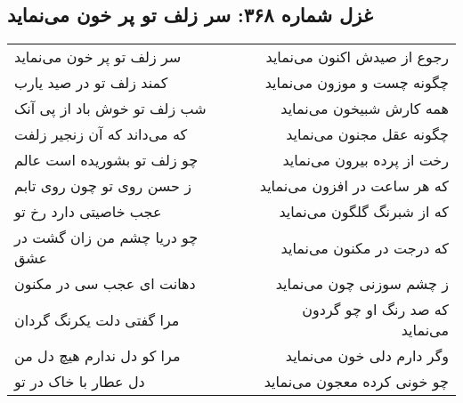 \begin{center}
\section*{غزل شماره ۳۶۸: سر زلف تو پر خون می‌نماید}
\label{sec:368}
\begin{longtable}{l p{0.5cm} r}
سر زلف تو پر خون می‌نماید
&&
رجوع از صیدش اکنون می‌نماید
\\
کمند زلف تو در صید یارب
&&
چگونه چست و موزون می‌نماید
\\
شب زلف تو خوش باد از پی آنک
&&
همه کارش شبیخون می‌نماید
\\
که می‌داند که آن زنجیر زلفت
&&
چگونه عقل مجنون می‌نماید
\\
چو زلف تو بشوریده است عالم
&&
رخت از پرده بیرون می‌نماید
\\
ز حسن روی تو چون روی تابم
&&
که هر ساعت در افزون می‌نماید
\\
عجب خاصیتی دارد رخ تو
&&
که از شبرنگ گلگون می‌نماید
\\
چو دریا چشم من زان گشت در عشق
&&
که درجت در مکنون می‌نماید
\\
دهانت ای عجب سی در مکنون
&&
ز چشم سوزنی چون می‌نماید
\\
مرا گفتی دلت یکرنگ گردان
&&
که صد رنگ او چو گردون می‌نماید
\\
مرا کو دل ندارم هیچ دل من
&&
وگر دارم دلی خون می‌نماید
\\
دل عطار با خاک در تو
&&
چو خونی کرده معجون می‌نماید
\\
\end{longtable}
\end{center}
